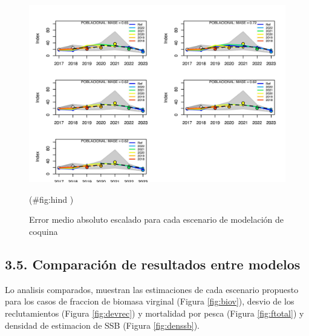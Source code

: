 \documentclass[
]{article}
\begin{document}
\begin{figure}[H]

{\centering \includegraphics{Dtrunculus_SS3_2024_files/figure-latex/hind -1} 

}

\caption{\label{fig:hind}Error medio absoluto escalado para cada escenario de modelación de coquina}(\#fig:hind )
\end{figure}

\pagebreak

\hypertarget{comparaciuxf3n-de-resultados-entre-modelos}{%
\subsection{3.5. Comparación de resultados entre modelos}\label{comparaciuxf3n-de-resultados-entre-modelos}}

Lo analisis comparados, muestran las estimaciones de cada escenario propuesto para los casos de fraccion de biomasa virginal (Figura \ref{fig:biov}), desvio de los reclutamientos (Figura \ref{fig:devrec}) y mortalidad por pesca (Figura \ref{fig:ftotal}) y densidad de estimacion de SSB (Figura \ref{fig:denssb}).
\end{document}

